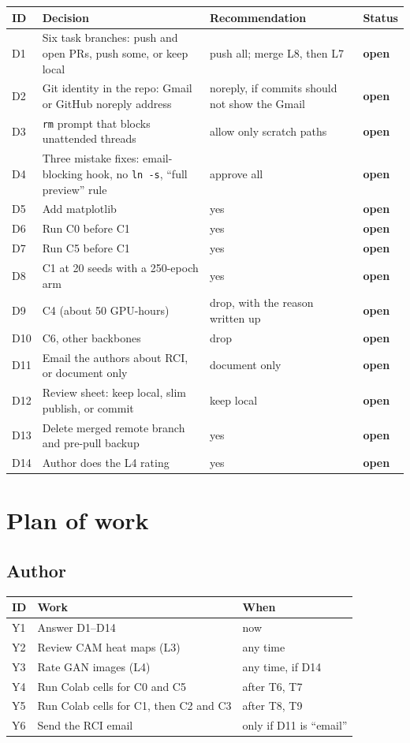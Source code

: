 \documentclass[10pt,a4paper]{article}
\newcommand{\todo}{\textcolor{bad}{\textbf{open}}}
\begin{document}
\noindent
\begin{tabularx}{\linewidth}{@{}l Y Y l@{}}
\toprule
ID & Decision & Recommendation & Status \\
\midrule
D1 & Six task branches: push and open PRs, push some, or keep local & push all; merge L8, then L7 & \todo \\
D2 & Git identity in the repo: Gmail or GitHub noreply address & noreply, if commits should not show the Gmail & \todo \\
D3 & \texttt{rm} prompt that blocks unattended threads & allow only scratch paths & \todo \\
D4 & Three mistake fixes: email-blocking hook, no \texttt{ln -s}, ``full preview'' rule & approve all & \todo \\
D5 & Add matplotlib & yes & \todo \\
D6 & Run C0 before C1 & yes & \todo \\
D7 & Run C5 before C1 & yes & \todo \\
D8 & C1 at 20 seeds with a 250-epoch arm & yes & \todo \\
D9 & C4 (about 50 GPU-hours) & drop, with the reason written up & \todo \\
D10 & C6, other backbones & drop & \todo \\
D11 & Email the authors about RCI, or document only & document only & \todo \\
D12 & Review sheet: keep local, slim publish, or commit & keep local & \todo \\
D13 & Delete merged remote branch and pre-pull backup & yes & \todo \\
D14 & Author does the L4 rating & yes & \todo \\
\bottomrule
\end{tabularx}

\section{Plan of work}

\subsection{Author}
\noindent
\begin{tabularx}{\linewidth}{@{}l Y l@{}}
\toprule
ID & Work & When \\
\midrule
Y1 & Answer D1--D14 & now \\
Y2 & Review CAM heat maps (L3) & any time \\
Y3 & Rate GAN images (L4) & any time, if D14 \\
Y4 & Run Colab cells for C0 and C5 & after T6, T7 \\
Y5 & Run Colab cells for C1, then C2 and C3 & after T8, T9 \\
Y6 & Send the RCI email & only if D11 is ``email'' \\
\bottomrule
\end{tabularx}
\end{document}
